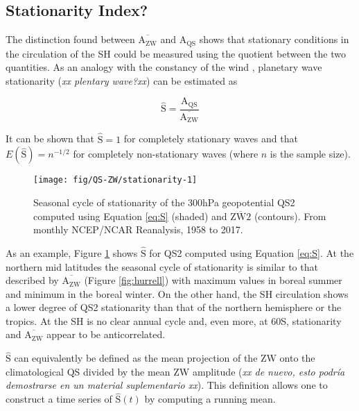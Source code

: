 \documentclass[draft,linenumbers]{agujournal2018}
\begin{document}
\subsection{Stationarity Index?}

The distinction found between \(\overline{\mathrm{A_{ZW}}}\) and
\(\mathrm{A_{QS}}\) shows that stationary conditions in the circulation
of the SH could be measured using the quotient between the two
quantities. As an analogy with the constancy of the wind
\citep{Singer1967}, planetary wave stationarity (\emph{xx plentary
wave?xx}) can be estimated as

\begin{linenomath*}
\begin{equation}\label{eq:S}
\hat{\mathrm{S}} = \frac{\mathrm{\mathrm{A_{QS}}}}{\overline{\mathrm{A_{ZW}}}}
\end{equation}
\end{linenomath*}

It can be shown that \(\hat{\mathrm{S}} = 1\) for completely stationary
waves and that \(E(\hat{\mathrm{S}}) = n^{-1/2}\) for completely
non-stationary waves (where \(n\) is the sample size).

\begin{figure}[h]

{\centering \texttt{[image: fig/QS-ZW/stationarity-1]} 

}

\caption{Seasonal cycle of stationarity of the 300hPa geopotential QS2 computed using Equation \ref{eq:S} (shaded) and $\overline{\mathrm{ZW2}}$ (contours). From monthly NCEP/NCAR Reanalysis, 1958 to 2017.}\label{fig:stationarity}
\end{figure}

As an example, Figure \ref{fig:stationarity} shows \(\hat{\mathrm{S}}\)
for QS2 computed using Equation \ref{eq:S}. At the northern mid
latitudes the seasonal cycle of stationarity is similar to that
described by \(\overline{\mathrm{A_{ZW}}}\) (Figure \ref{fig:hurrell})
with maximum values in boreal summer and minimum in the boreal winter.
On the other hand, the SH circulation shows a lower degree of QS2
stationarity than that of the northern hemisphere or the tropics. At the
SH is no clear annual cycle and, even more, at 60\degree S, stationarity
and \(\overline{\mathrm{A_{ZW}}}\) appear to be anticorrelated.

\(\hat{\mathrm{S}}\) can equivalently be defined as the mean projection
of the ZW onto the climatological QS divided by the mean ZW amplitude
(\emph{xx de nuevo, esto podría demostrarse en un material suplementario
xx}). This definition allows one to construct a time series of
\(\hat{\mathrm{S}}(t)\) by computing a running mean.
\end{document}
